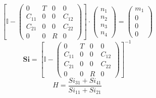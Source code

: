 \[ \left[ \mathbb{I}  - \left(\begin{smallmatrix} 0 & T & 0 & 0 \\ C_{11} & 0 & 0 & C_{12} \\ C_{21} & 0 & 0 & C_{22} \\ 0 & 0 & R & 0 \end{smallmatrix}\right)\right] \cdot \left(\begin{smallmatrix} n_{1} \\ n_{2} \\ n_{3} \\ n_{4} \end{smallmatrix}\right) = \left(\begin{smallmatrix} m_{1} \\ 0 \\ 0 \\ 0 \end{smallmatrix}\right) \]
\[ \mathbf{Si} = \left[ \mathbb{I}  - \left(\begin{smallmatrix} 0 & T & 0 & 0 \\ C_{11} & 0 & 0 & C_{12} \\ C_{21} & 0 & 0 & C_{22} \\ 0 & 0 & R & 0 \end{smallmatrix}\right) \right]^{-1} \]
\[ H = \frac{ Si_{31} + Si_{41} }{ Si_{11} + Si_{21} }  \]
